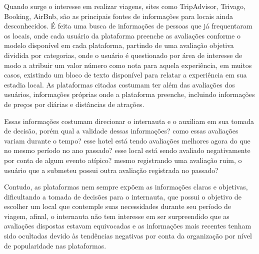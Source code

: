 Quando surge o interesse em realizar viagens, sites como TripAdvisor, Trivago, Booking, AirBnb, são as principais fontes de informações para locais ainda desconhecidos. É feita uma busca de informações de pessoas que já frequentaram os locais, onde cada usuário da plataforma preenche as avaliações conforme o modelo disponível em cada plataforma, partindo de uma avaliação objetiva dividida por categorias, onde o usuário é questionado por área de interesse de modo a atribuir um valor número como nota para aquela experiência, em muitos casos, existindo um bloco de texto disponível para relatar a experiência em sua estadia local. As plataformas citadas costumam ter além das avaliações dos usuários, informações próprias onde a plataforma preenche, incluindo informações de preços por diárias e distâncias de atrações.

Essas informações costumam direcionar o internauta e o auxiliam em sua tomada de decisão, porém qual a validade dessas informações? como essas avaliações variam durante o tempo? esse hotel está tendo avaliações melhores agora do que no mesmo período no ano passado? esse local está sendo avaliado negativamente por conta de algum evento atípico? mesmo registrando uma avaliação ruim, o usuário que a submeteu possui outra avaliação registrada no passado?

Contudo, as plataformas nem sempre expõem as informações claras e objetivas, dificultando a tomada de decisões para o internauta, que possui o objetivo de escolher um local que contemple suas necessidades durante seu período de viagem, afinal, o internauta não tem interesse em ser surpreendido que as avaliações dispostas estavam equivocadas e as informações mais recentes tenham sido ocultadas devido às tendências negativas por conta da organização por nível de popularidade nas plataformas.

\begin{comment}
O presente relatório está estruturado da seguinte forma: o capítulo~\ref{cap:justificativa} apresenta..., o capítulo~\ref{cap:fund_teorica} ... O capítulo~\ref{cap:metodologia} ..., o capítulo~\ref{cap:resultados} ... O capítulo~\ref{cap:conclusao} 

Demonstração de citação: o software de análise foi desenvolvido na linguagem Python~\cite{van1995python}, usando as bibliotecas Pandas~\cite{mckinney2010data} e Scikit-learn~\cite{scikit-learn}.
\end{comment}

\begin{comment}
    como o sentimento dos usuários que avaliaram o estabelecimento variou durante o tempo, se o recinto está recebendo avaliações com sentimentos mais positivos ou se a tendência é de que as avaliações continuem com sentimentos cada vez mais negativos, e identificar possíveis mudanças de comportamento, que para esses cenários podem ser justificados por mudanças de equipe, mudanças de políticas internas da empresa ou por uma simples manutenção ou evolução das instalações
    , a fim de observar e entender as variações de sentimentos das avaliações realizadas pelos usuários da plataforma distribuídos durante o tempo.
\end{comment}

